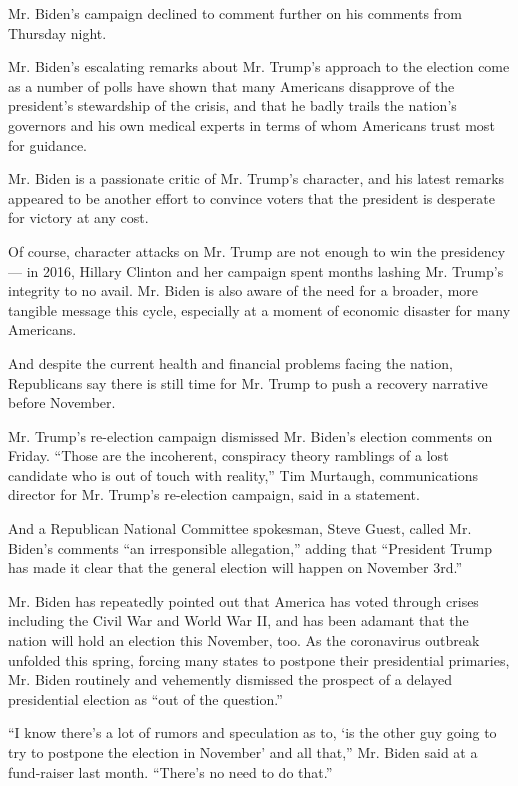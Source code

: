 Mr. Biden's campaign declined to comment further on his comments from
Thursday night.

Mr. Biden's escalating remarks about Mr. Trump's approach to the
election come as a number of polls have shown that many Americans
disapprove of the president's stewardship of the crisis, and that he
badly trails the nation's governors and his own medical experts in terms
of whom Americans trust most for guidance.

Mr. Biden is a passionate critic of Mr. Trump's character, and his
latest remarks appeared to be another effort to convince voters that the
president is desperate for victory at any cost.

Of course, character attacks on Mr. Trump are not enough to win the
presidency --- in 2016, Hillary Clinton and her campaign spent months
lashing Mr. Trump's integrity to no avail. Mr. Biden is also aware of
the need for a broader, more tangible message this cycle, especially at
a moment of economic disaster for many Americans.

And despite the current health and financial problems facing the nation,
Republicans say there is still time for Mr. Trump to push a recovery
narrative before November.

Mr. Trump's re-election campaign dismissed Mr. Biden's election comments
on Friday. ``Those are the incoherent, conspiracy theory ramblings of a
lost candidate who is out of touch with reality,'' Tim Murtaugh,
communications director for Mr. Trump's re-election campaign, said in a
statement.

And a Republican National Committee spokesman, Steve Guest, called Mr.
Biden's comments ``an irresponsible allegation,'' adding that
``President Trump has made it clear that the general election will
happen on November 3rd.''

Mr. Biden has repeatedly pointed out that America has voted through
crises including the Civil War and World War II, and has been adamant
that the nation will hold an election this November, too. As the
coronavirus outbreak unfolded this spring, forcing many states to
postpone their presidential primaries, Mr. Biden routinely and
vehemently dismissed the prospect of a delayed presidential election as
``out of the question.''

``I know there's a lot of rumors and speculation as to, `is the other
guy going to try to postpone the election in November' and all that,''
Mr. Biden said at a fund-raiser last month. ``There's no need to do
that.''

